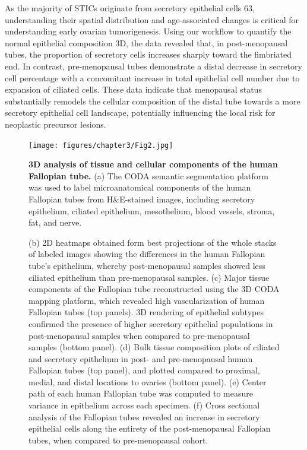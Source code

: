 \begin{refsection}
    As the majority of STICs originate from secretory epithelial cells\cite{Kobayashi2017conceptual} 63, understanding their spatial distribution and age-associated changes is critical for understanding early ovarian tumorigenesis. Using our workflow to quantify the normal epithelial composition 3D, the data revealed that, in post-menopausal tubes, the proportion of secretory cells increases sharply toward the fimbriated end. In contrast, pre-menopausal tubes demonstrate a distal decrease in secretory cell percentage with a concomitant increase in total epithelial cell number due to expansion of ciliated cells. These data indicate that menopausal status substantially remodels the cellular composition of the distal tube towards a more secretory epithelial cell landscape, potentially influencing the local risk for neoplastic precursor lesions.

    \begin{figure}[p]
        \begin{center}
            \texttt{[image: figures/chapter3/Fig2.jpg]}
            \captionsetup{font=small}
            \caption{\textbf{3D analysis of tissue and cellular components of the human Fallopian tube.} (a) The CODA semantic segmentation platform was used to label microanatomical components of the human Fallopian tubes from H\&E-stained images, including secretory epithelium, ciliated epithelium, mesothelium, blood vessels, stroma, fat, and nerve.}
            \label{chapter3_fig2}
        \end{center}
    \end{figure}
    
    \begin{figure}[h!]
        \ContinuedFloat
        \captionsetup{font=small}
        \caption[]{(b) 2D heatmaps obtained form best projections of the whole stacks of labeled images showing the differences in the human Fallopian tube’s epithelium, whereby post-menopausal samples showed less ciliated epithelium than pre-menopausal samples. (c) Major tissue components of the Fallopian tube reconstructed using the 3D CODA mapping platform, which revealed high vascularization of human Fallopian tubes (top panels). 3D rendering of epithelial subtypes confirmed the presence of higher secretory epithelial populations in post-menopausal samples when compared to pre-menopausal samples (bottom panel). (d) Bulk tissue composition plots of ciliated and secretory epithelium in post- and pre-menopausal human Fallopian tubes (top panel), and plotted compared to proximal, medial, and distal locations to ovaries (bottom panel). (e) Center path of each human Fallopian tube was computed to measure variance in epithelium across each specimen. (f) Cross sectional analysis of the Fallopian tubes revealed an increase in secretory epithelial cells along the entirety of the post-menopausal Fallopian tubes, when compared to pre-menopausal cohort.}
    \end{figure}


\end{refsection}
